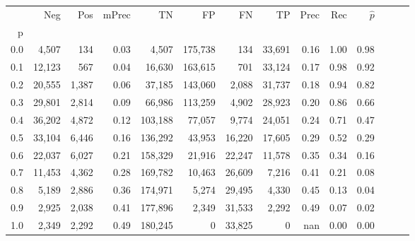 \begin{tabular}{rrrrrrrrrrrrrr}
\toprule
{} &     Neg &    Pos & mPrec &       TN &       FP &      FN &      TP &  Prec &   Rec & $\hat{p}$ \\
p   &         &        &       &          &          &         &         &       &       &           \\
\midrule
0.0 &   4,507 &    134 &  0.03 &    4,507 &  175,738 &     134 &  33,691 &  0.16 &  1.00 &      0.98 \\
0.1 &  12,123 &    567 &  0.04 &   16,630 &  163,615 &     701 &  33,124 &  0.17 &  0.98 &      0.92 \\
0.2 &  20,555 &  1,387 &  0.06 &   37,185 &  143,060 &   2,088 &  31,737 &  0.18 &  0.94 &      0.82 \\
0.3 &  29,801 &  2,814 &  0.09 &   66,986 &  113,259 &   4,902 &  28,923 &  0.20 &  0.86 &      0.66 \\
0.4 &  36,202 &  4,872 &  0.12 &  103,188 &   77,057 &   9,774 &  24,051 &  0.24 &  0.71 &      0.47 \\
0.5 &  33,104 &  6,446 &  0.16 &  136,292 &   43,953 &  16,220 &  17,605 &  0.29 &  0.52 &      0.29 \\
0.6 &  22,037 &  6,027 &  0.21 &  158,329 &   21,916 &  22,247 &  11,578 &  0.35 &  0.34 &      0.16 \\
0.7 &  11,453 &  4,362 &  0.28 &  169,782 &   10,463 &  26,609 &   7,216 &  0.41 &  0.21 &      0.08 \\
0.8 &   5,189 &  2,886 &  0.36 &  174,971 &    5,274 &  29,495 &   4,330 &  0.45 &  0.13 &      0.04 \\
0.9 &   2,925 &  2,038 &  0.41 &  177,896 &    2,349 &  31,533 &   2,292 &  0.49 &  0.07 &      0.02 \\
1.0 &   2,349 &  2,292 &  0.49 &  180,245 &        0 &  33,825 &       0 &   nan &  0.00 &      0.00 \\
\bottomrule
\end{tabular}
